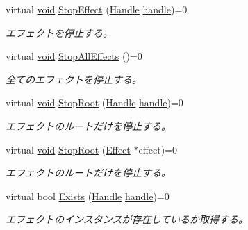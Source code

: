 \begin{DoxyCompactItemize}
virtual \mbox{\hyperlink{namespace_effekseer_ab34c4088e512200cf4c2716f168deb56}{void}} \mbox{\hyperlink{class_effekseer_1_1_manager_a7a4a9ff929146f8ea21aa4705b352baa}{Stop\+Effect}} (\mbox{\hyperlink{namespace_effekseer_afba58b8d812da862190e9bbfc040824a}{Handle}} \mbox{\hyperlink{namespace_effekseer_afd99b336b206999bdcca3e431648efbc}{handle}})=0
\begin{DoxyCompactList}\small\item\em エフェクトを停止する。 \end{DoxyCompactList}\item 
virtual \mbox{\hyperlink{namespace_effekseer_ab34c4088e512200cf4c2716f168deb56}{void}} \mbox{\hyperlink{class_effekseer_1_1_manager_a65a6043aace92f52bcb8f7fc1052d3f0}{Stop\+All\+Effects}} ()=0
\begin{DoxyCompactList}\small\item\em 全てのエフェクトを停止する。 \end{DoxyCompactList}\item 
virtual \mbox{\hyperlink{namespace_effekseer_ab34c4088e512200cf4c2716f168deb56}{void}} \mbox{\hyperlink{class_effekseer_1_1_manager_adbde475d5977ca36c0a3a4c1e6878b33}{Stop\+Root}} (\mbox{\hyperlink{namespace_effekseer_afba58b8d812da862190e9bbfc040824a}{Handle}} \mbox{\hyperlink{namespace_effekseer_afd99b336b206999bdcca3e431648efbc}{handle}})=0
\begin{DoxyCompactList}\small\item\em エフェクトのルートだけを停止する。 \end{DoxyCompactList}\item 
virtual \mbox{\hyperlink{namespace_effekseer_ab34c4088e512200cf4c2716f168deb56}{void}} \mbox{\hyperlink{class_effekseer_1_1_manager_ad7989b68ceb3125cf6ef0d4062462a3d}{Stop\+Root}} (\mbox{\hyperlink{class_effekseer_1_1_effect}{Effect}} $\ast$effect)=0
\begin{DoxyCompactList}\small\item\em エフェクトのルートだけを停止する。 \end{DoxyCompactList}\item 
virtual bool \mbox{\hyperlink{class_effekseer_1_1_manager_ad95297e9170c9f9874eb6bf951aa5dc0}{Exists}} (\mbox{\hyperlink{namespace_effekseer_afba58b8d812da862190e9bbfc040824a}{Handle}} \mbox{\hyperlink{namespace_effekseer_afd99b336b206999bdcca3e431648efbc}{handle}})=0
\begin{DoxyCompactList}\small\item\em エフェクトのインスタンスが存在しているか取得する。 \end{DoxyCompactList}\item 

\end{DoxyCompactItemize}

